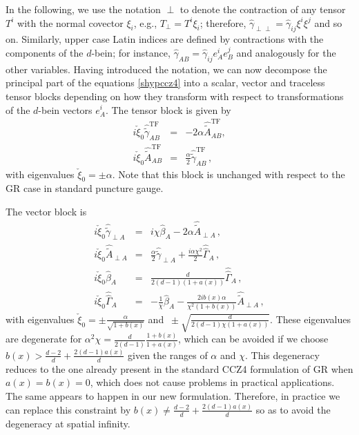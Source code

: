\documentclass[reprint,aps,amsmath,amssymb,twoside,prd,showkeys,superscriptaddress,nofootinbib]{revtex4-2}
\begin{document}
In the following,  we use the notation $\perp$ to denote the contraction of any tensor $T^i$ with the normal covector $\xi_i$, e.g., $T_\perp=T^i\xi_i$; therefore,  $\hat{\gamma}_{\perp\perp}=\hat{\gamma}_{ij}\xi^i\xi^j$ and so on. Similarly, upper case Latin indices are defined by contractions with the components of the $d$-bein; for instance, $\hat{\gamma}_{AB}=\hat{\gamma}_{ij}e_A^ie_B^j$ and analogously for the other variables. Having introduced the notation, we can now decompose the principal part of the equations \eqref{shypccz4} into a scalar, vector and traceless tensor blocks depending on how they transform with respect to transformations of the $d$-bein vectors $e_A^i$.  The tensor block  is given by
\begin{subequations}\label{hyp_tensor}
\begin{eqnarray}
i\check{\xi}_0\hat{\tilde{\gamma}}_{AB}^{\text{TF}} &=& -2\alpha\hat{\tilde{A}}_{AB}^{\text{TF}}, \\ i\check{\xi}_0\hat{\tilde{A}}_{AB}^{\text{TF}} &=& \tfrac{\alpha}{2}\hat{\tilde{\gamma}}_{AB}^{\text{TF}}\, ,
\end{eqnarray}
\end{subequations}
with eigenvalues $\check{\xi}_0=\pm\alpha$. Note that this block is unchanged with respect to the GR case in standard puncture gauge.%

The vector block is
\begin{subequations}\label{hyp_vector}
\begin{eqnarray}
i\check{\xi}_0\hat{\tilde{\gamma}}_{\perp A}&=&i\chi\hat{\beta}_A-2\alpha\hat{\tilde{A}}_{\perp A}\,, \\ i\check{\xi}_0\hat{\tilde{A}}_{\perp A} &=& \tfrac{\alpha}{2}\hat{\tilde{\gamma}}_{\perp A} + \tfrac{i\alpha\chi^2}{2}\hat{\hat{\Gamma}}_A\,, \\ i\check{\xi}_0\hat{\beta}_A &=& \tfrac{d}{2(d-1)(1+a(x))}\hat{\hat{\Gamma}}_A\,, \\ i\check{\xi}_0\hat{\hat{\Gamma}}_A &=& -\tfrac{1}{\chi}\hat{\beta}_A -\tfrac{2ib(x)\alpha}{\chi^2(1+b(x))}\hat{\tilde{A}}_ {\perp A}\,,
\end{eqnarray}
\end{subequations}
with eigenvalues $\check{\xi}_0=\pm\tfrac{\alpha}{\sqrt{1+b(x)}}$ and $~\pm\sqrt{\tfrac{d}{2(d-1)\chi(1+a(x))}}$. These eigenvalues are degenerate for $\alpha^2\chi=\tfrac{d}{2(d-1)}\tfrac{1+b(x)}{1+a(x)}$,  which can be avoided if we choose $b(x)>\tfrac{d-2}{d}+\frac{2(d-1)a(x)}{d}$ given the ranges of $\alpha$ and $\chi$. This degeneracy reduces to the one already present in the standard CCZ4 formulation of GR when $a(x)=b(x)=0$, which does not cause problems in practical applications. The same appears to happen in our new formulation. Therefore, in practice we can replace this constraint by $b(x)\neq\tfrac{d-2}{d}+\frac{2(d-1)a(x)}{d}$ so as to avoid the degeneracy at spatial infinity.
\end{document}
